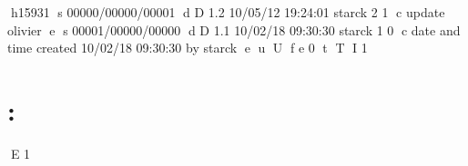 h15931
s 00000/00000/00001
d D 1.2 10/05/12 19:24:01 starck 2 1
c update olivier
e
s 00001/00000/00000
d D 1.1 10/02/18 09:30:30 starck 1 0
c date and time created 10/02/18 09:30:30 by starck
e
u
U
f e 0
t
T
I 1
\part{\projpol:  }
E 1
